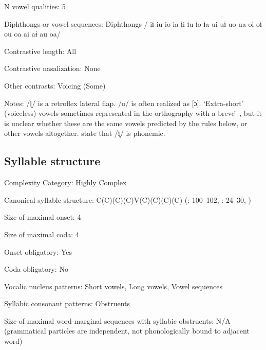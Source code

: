 {\begin{appendixdesc}
\item[N vowel qualities:] 5

\item[Diphthongs or vowel sequences:] Diphthongs / iɨ iu io ia ɨi ɨu ɨo ɨa ui uɨ uo ua oi oɨ ou oa ai aɨ au oa/

\item[Contrastive length:] All

\item[Contrastive nasalization:] None

\item[Other contrasts:] Voicing (Some)

\item[Notes:] /ɭ/ is a retroflex lateral flap. /o/ is often realized as [ɔ]. ‘Extra-short’ (voiceless) vowels sometimes represented in the orthography with a breve  \u{} , but it is unclear whether these are the same vowels predicted by the rules below, or other vowels altogether.   \citet[236]{DoloresMathiot1991} state that /i̥/ is phonemic.
\end{appendixdesc}
\subsection*{Syllable structure}
\begin{appendixdesc}

\item[Complexity Category:] Highly Complex

\item[Canonical syllable structure:] C(C)(C)(C)V(C)(C)(C)(C) (\citealt{Saxton1982}: 100--102, \citealt{Hale1959}: 24--30, \citealt{HillZepeda1992})

\item[Size of maximal onset:] 4

\item[Size of maximal coda:] 4

\item[Onset obligatory:] Yes

\item[Coda obligatory:] No

\item[Vocalic nucleus patterns:] Short vowels, Long vowels, Vowel sequences

\item[Syllabic consonant patterns:] Obstruents

\item[Size of maximal word-marginal sequences with syllabic obstruents:] N/A (grammatical particles are independent, not phonologically bound to adjacent word)


\end{appendixdesc}}
